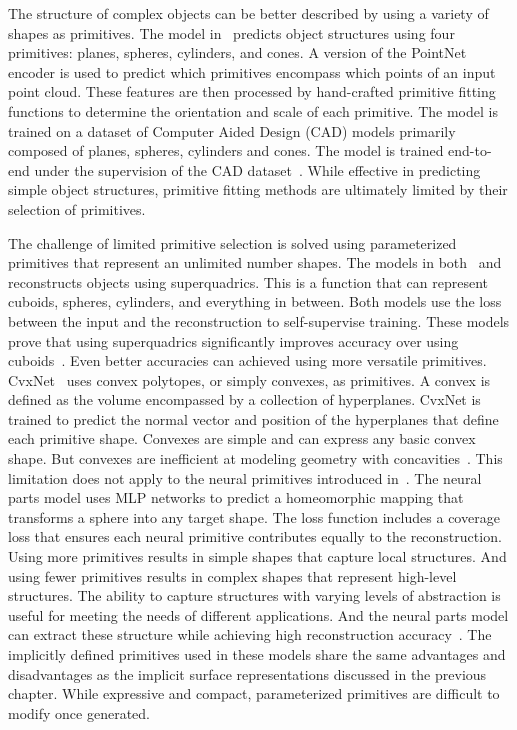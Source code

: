 The structure of complex objects can be better described by using a variety of shapes as primitives. The model in~\cite{Li2019} predicts object structures using four primitives: planes, spheres, cylinders, and cones. A version of the PointNet encoder is used to predict which primitives encompass which points of an input point cloud. These features are then processed by hand-crafted primitive fitting functions to determine the orientation and scale of each primitive. The model is trained on a dataset of Computer Aided Design (CAD) models primarily composed of planes, spheres, cylinders and cones. The model is trained end-to-end under the supervision of the CAD dataset~\cite{Li2019}. While effective in predicting simple object structures, primitive fitting methods are ultimately limited by their selection of primitives.

The challenge of limited primitive selection is solved using parameterized primitives that represent an unlimited number shapes. The models in both~\cite{Paschalidou2019} and~\cite{Paschalidou2020} reconstructs objects using superquadrics. This is a function that can represent cuboids, spheres, cylinders, and everything in between. Both models use the loss between the input and the reconstruction to self-supervise training. These models prove that using superquadrics significantly improves accuracy over using cuboids~\cite{Paschalidou2019}. Even better accuracies can achieved using more versatile primitives. CvxNet~\cite{Deng2020} uses convex polytopes, or simply convexes, as primitives. A convex is defined as the volume encompassed by a collection of hyperplanes. CvxNet is trained to predict the normal vector and position of the hyperplanes that define each primitive shape. Convexes are simple and can express any basic convex shape. But convexes are inefficient at modeling geometry with concavities~\cite{Deng2020}. This limitation does not apply to the neural primitives introduced in~\cite{Paschalidou2021}. The neural parts model uses MLP networks to predict a homeomorphic mapping that transforms a sphere into any target shape. The loss function includes a coverage loss that ensures each neural primitive contributes equally to the reconstruction. Using more primitives results in simple shapes that capture local structures. And using fewer primitives results in complex shapes that represent high-level structures. The ability to capture structures with varying levels of abstraction is useful for meeting the needs of different applications. And the neural parts model can extract these structure while achieving high reconstruction accuracy~\cite{Paschalidou2021}. The implicitly defined primitives used in these models share the same advantages and disadvantages as the implicit surface representations discussed in the previous chapter. While expressive and compact, parameterized primitives are difficult to modify once generated.

